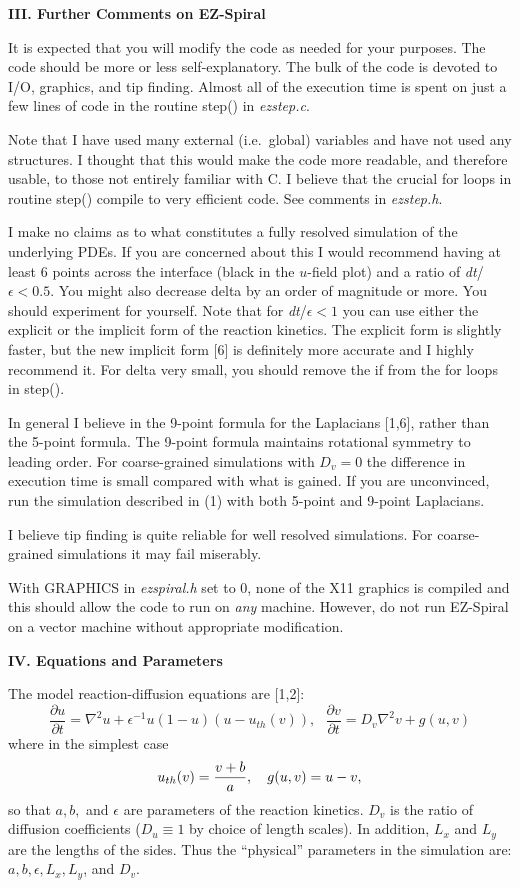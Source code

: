 \documentclass[12pt]{article}
\begin{document}
{\bf III. Further Comments on EZ-Spiral} 

It is expected that you will modify the code as needed for your
purposes.  The code should be more or less self-explanatory. The bulk
of the code is devoted to I/O, graphics, and tip finding. Almost all
of the execution time is spent on just a few lines of code in the
routine {\sf step()} in {\em ezstep.c}.

Note that I have used many external (i.e.~global) variables and have
not used any structures.  I thought that this would make the code more
readable, and therefore usable, to those not entirely familiar with C.
I believe that the crucial {\sf for} loops in routine {\sf step()}
compile to very efficient code. See comments in {\em ezstep.h}.

I make no claims as to what constitutes a fully resolved simulation of
the underlying PDEs.  If you are concerned about this I would
recommend having at least 6 points across the interface (black in the
$u$-field plot) and a ratio of {\sl dt}/$\epsilon<0.5$.  You might
also decrease {\sf delta} by an order of magnitude or more.  You
should experiment for yourself.  Note that for {\sl dt}/$\epsilon<1$
you can use either the explicit or the implicit form of the reaction
kinetics.  The explicit form is slightly faster, but the new implicit
form [6] is definitely more accurate and I highly recommend it.  For
{\sf delta} very small, you should remove the {\sf if} from the {\sf
for} loops in {\sf step()}.

In general I believe in the 9-point formula for the Laplacians [1,6],
rather than the 5-point formula.  The 9-point formula maintains
rotational symmetry to leading order.  For coarse-grained simulations
with $D_v=0$ the difference in execution time is small compared with
what is gained.  If you are unconvinced, run the simulation described
in (1) with both 5-point and 9-point Laplacians.

I believe tip finding is quite reliable for well resolved simulations.
For coarse-grained simulations it may fail miserably.

With {\sf GRAPHICS} in {\em ezspiral.h} set to 0, none of the X11
graphics is compiled and this should allow the code to run on {\em
any} machine.  However, do not run EZ-Spiral on a vector machine
without appropriate modification.

{\bf IV. Equations and Parameters} 

The model reaction-diffusion equations are [1,2]:
$$
\frac{\partial u }{ \partial t} = \nabla^2 u + 
	\epsilon^{-1} u(1-u)(u-u_{th}(v)), ~~~
\frac{\partial v }{ \partial t} = D_v \nabla^2 v + g(u,v)
$$
where in the simplest case
$$
u_{th}(v) = {{v+b}\over{a}}, ~~~
g(u,v) = u-v, 
$$ 
so that $a,b,$ and $\epsilon$ are parameters of the reaction
kinetics.  $D_v$ is the ratio of diffusion coefficients ($D_u \equiv
1$ by choice of length scales). In addition, $L_x$ and $L_y$ are the lengths
of the sides. Thus the ``physical'' parameters in the
simulation are: $a, b, \epsilon, L_x, L_y$, and $D_v$.
\end{document}
